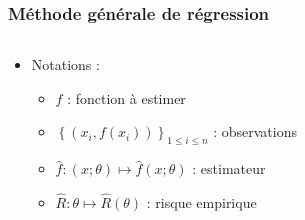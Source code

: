 \documentclass[c]{beamer}
\begin{document}
\begin{frame}
  \frametitle{M\'ethode g\'en\'erale de régression}

  \begin{columns}
    \begin{column}{.6\textwidth}
      \begin{itemize}
        \item Notations :
        \begin{itemize}
          \item<1-> $f$ : fonction à estimer
          \item<2-> $\left\{ \left( x_i, f(x_i) \right) \right\}_{1 \leq i \leq n}$ : observations
          \item<3-> $\hat{f} : (x; \theta) \mapsto \hat{f}(x; \theta)$ : estimateur
          \item<4-> $\hat{R} : \theta \mapsto \hat{R}(\theta)$ : risque empirique
        \end{itemize}
      \end{itemize}
    \end{column}
    \begin{column}{.4\textwidth}
        \begin{figure}
\end{figure}
\end{column}
\end{columns}
\end{frame}
\end{document}
